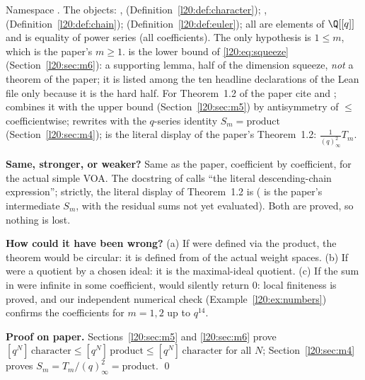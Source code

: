 \begin{dictionary}
Namespace . The objects: , 
(Definition~\ref{l20:def:character}); , 
(Definition~\ref{l20:def:chain});  (Definition~\ref{l20:def:euler}); all are elements of
$\Q[[q]]$ and \lean{=} is equality of power series (all coefficients). The only hypothesis is $1\le m$, which is
the paper's $m\ge1$.  is the lower bound of \eqref{l20:eq:squeeze} (Section~\ref{l20:sec:m6}):
a supporting lemma, half of the dimension squeeze, \emph{not} a theorem of the paper; it is listed among the ten headline
declarations of the Lean file only because it is the hard half. For Theorem~1.2 of the paper cite
 and ;
 combines it with the upper bound  (Section~\ref{l20:sec:m5})
by antisymmetry of $\le$ coefficientwise;  rewrites with the $q$-series identity
$S_m=\text{product}$ (Section~\ref{l20:sec:m4});  is the literal display of the paper's
Theorem~1.2: $\frac{1}{(q)^2_\infty}T_m$.

\textbf{Same, stronger, or weaker?} Same as the paper, coefficient by coefficient, for the actual simple VOA.
The docstring of  calls  ``the literal descending-chain
expression''; strictly, the literal display of Theorem~1.2 is 
( is the paper's intermediate $S_m$, with the residual sums not yet evaluated). Both
are proved, so nothing is lost.

\textbf{How could it have been wrong?} (a) If  were defined via the product, the theorem
would be circular: it is defined from  of the actual weight spaces. (b) If 
were a quotient by a chosen ideal: it is the maximal-ideal quotient. (c) If the sum in 
were infinite in some coefficient,  would silently return $0$: local finiteness is proved, and our
independent numerical check (Example~\ref{l20:ex:numbers}) confirms the coefficients for $m=1,2$ up to $q^{14}$.
\end{dictionary}

\textbf{Proof on paper.} Sections~\ref{l20:sec:m5} and \ref{l20:sec:m6} prove
$[q^N]\,\mathrm{character}\le[q^N]\,\mathrm{product}\le[q^N]\,\mathrm{character}$ for all $N$; Section~\ref{l20:sec:m4}
proves $S_m=T_m/(q)_\infty^2=\mathrm{product}$. \qed

